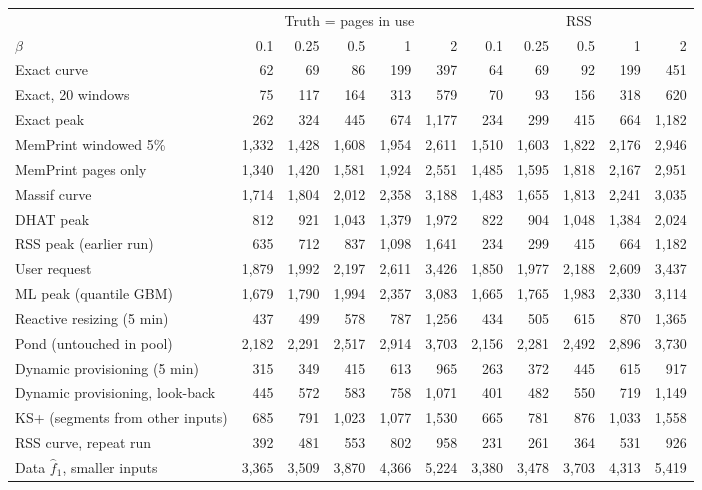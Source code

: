 \begin{tabular}{lrrrrrrrrrr}
\toprule
 & \multicolumn{5}{c}{Truth = pages in use} & \multicolumn{5}{c}{RSS} \\
\cmidrule(lr){2-6} \cmidrule(lr){7-11}
$\beta$ & 0.1 & 0.25 & 0.5 & 1 & 2 & 0.1 & 0.25 & 0.5 & 1 & 2 \\
\midrule
Exact curve & 62 & 69 & 86 & 199 & 397 & 64 & 69 & 92 & 199 & 451 \\
Exact, 20 windows & 75 & 117 & 164 & 313 & 579 & 70 & 93 & 156 & 318 & 620 \\
Exact peak & 262 & 324 & 445 & 674 & 1{,}177 & 234 & 299 & 415 & 664 & 1{,}182 \\
MemPrint windowed 5\% & 1{,}332 & 1{,}428 & 1{,}608 & 1{,}954 & 2{,}611 & 1{,}510 & 1{,}603 & 1{,}822 & 2{,}176 & 2{,}946 \\
MemPrint pages only & 1{,}340 & 1{,}420 & 1{,}581 & 1{,}924 & 2{,}551 & 1{,}485 & 1{,}595 & 1{,}818 & 2{,}167 & 2{,}951 \\
Massif curve & 1{,}714 & 1{,}804 & 2{,}012 & 2{,}358 & 3{,}188 & 1{,}483 & 1{,}655 & 1{,}813 & 2{,}241 & 3{,}035 \\
DHAT peak & 812 & 921 & 1{,}043 & 1{,}379 & 1{,}972 & 822 & 904 & 1{,}048 & 1{,}384 & 2{,}024 \\
RSS peak (earlier run) & 635 & 712 & 837 & 1{,}098 & 1{,}641 & 234 & 299 & 415 & 664 & 1{,}182 \\
User request & 1{,}879 & 1{,}992 & 2{,}197 & 2{,}611 & 3{,}426 & 1{,}850 & 1{,}977 & 2{,}188 & 2{,}609 & 3{,}437 \\
ML peak (quantile GBM) & 1{,}679 & 1{,}790 & 1{,}994 & 2{,}357 & 3{,}083 & 1{,}665 & 1{,}765 & 1{,}983 & 2{,}330 & 3{,}114 \\
Reactive resizing (5 min) & 437 & 499 & 578 & 787 & 1{,}256 & 434 & 505 & 615 & 870 & 1{,}365 \\
Pond (untouched in pool) & 2{,}182 & 2{,}291 & 2{,}517 & 2{,}914 & 3{,}703 & 2{,}156 & 2{,}281 & 2{,}492 & 2{,}896 & 3{,}730 \\
Dynamic provisioning (5 min) & 315 & 349 & 415 & 613 & 965 & 263 & 372 & 445 & 615 & 917 \\
Dynamic provisioning, look-back & 445 & 572 & 583 & 758 & 1{,}071 & 401 & 482 & 550 & 719 & 1{,}149 \\
KS+ (segments from other inputs) & 685 & 791 & 1{,}023 & 1{,}077 & 1{,}530 & 665 & 781 & 876 & 1{,}033 & 1{,}558 \\
RSS curve, repeat run & 392 & 481 & 553 & 802 & 958 & 231 & 261 & 364 & 531 & 926 \\
Data $\hat f_1$, smaller inputs & 3{,}365 & 3{,}509 & 3{,}870 & 4{,}366 & 5{,}224 & 3{,}380 & 3{,}478 & 3{,}703 & 4{,}313 & 5{,}419 \\
\bottomrule
\end{tabular}
